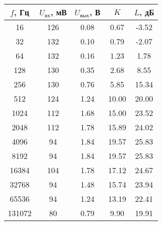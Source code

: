 \begin{tabular}{|c|c|c|c|c|}
  \hline
$f$, Гц & $U_{вх}$, мВ & $U_{вых}$, В & $K$ & $L$, дБ \\ 
  \hline
16 & 126 & 0.08 & 0.67 & -3.52 \\ 
   \hline
32 & 132 & 0.10 & 0.79 & -2.07 \\ 
   \hline
64 & 132 & 0.16 & 1.23 & 1.78 \\ 
   \hline
128 & 130 & 0.35 & 2.68 & 8.55 \\ 
   \hline
256 & 130 & 0.76 & 5.85 & 15.34 \\ 
   \hline
512 & 124 & 1.24 & 10.00 & 20.00 \\ 
   \hline
1024 & 112 & 1.68 & 15.00 & 23.52 \\ 
   \hline
2048 & 112 & 1.78 & 15.89 & 24.02 \\ 
   \hline
4096 & 94 & 1.84 & 19.57 & 25.83 \\ 
   \hline
8192 & 94 & 1.84 & 19.57 & 25.83 \\ 
   \hline
16384 & 104 & 1.78 & 17.12 & 24.67 \\ 
   \hline
32768 & 94 & 1.48 & 15.74 & 23.94 \\ 
   \hline
65536 & 94 & 1.24 & 13.19 & 22.41 \\ 
   \hline
131072 & 80 & 0.79 & 9.90 & 19.91 \\ 
   \hline
\end{tabular}
